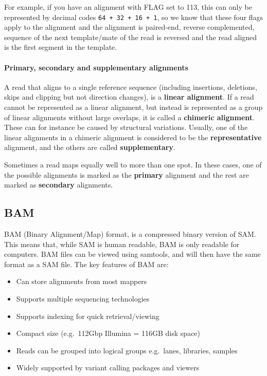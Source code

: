 \documentclass[11pt]{article}
\providecommand{\tightlist}{%
      \setlength{\itemsep}{0pt}\setlength{\parskip}{0pt}}
\begin{document}
For example, if you have an alignment with FLAG set to 113, this can
only be represented by decimal codes \texttt{64\ +\ 32\ +\ 16\ +\ 1}, so
we know that these four flags apply to the alignment and the alignment
is paired-end, reverse complemented, sequence of the next template/mate
of the read is reversed and the read aligned is the first segment in the
template.

\hypertarget{primary-secondary-and-supplementary-alignments}{%
\paragraph{Primary, secondary and supplementary
alignments}\label{primary-secondary-and-supplementary-alignments}}

A read that aligns to a single reference sequence (including insertions,
deletions, skips and clipping but not direction changes), is a
\textbf{linear alignment}. If a read cannot be represented as a linear
alignment, but instead is represented as a group of linear alignments
without large overlaps, it is called a \textbf{chimeric alignment}.
These can for instance be caused by structural variations. Usually, one
of the linear alignments in a chimeric alignment is considered to be the
\textbf{representative} alignment, and the others are called
\textbf{supplementary}.

Sometimes a read maps equally well to more than one spot. In these
cases, one of the possible alignments is marked as the \textbf{primary}
alignment and the rest are marked as \textbf{secondary} alignments.

\hypertarget{bam}{%
\subsection{BAM}\label{bam}}

BAM (Binary Alignment/Map) format, is a compressed binary version of
SAM. This means that, while SAM is human readable, BAM is only readable
for computers. BAM files can be viewed using samtools, and will then
have the same format as a SAM file. The key features of BAM are:

\begin{itemize}
\tightlist
\item
  Can store alignments from most mappers
\item
  Supports multiple sequencing technologies
\item
  Supports indexing for quick retrieval/viewing
\item
  Compact size (e.g.~112Gbp Illumina = 116GB disk space)
\item
  Reads can be grouped into logical groups e.g.~lanes, libraries,
  samples
\item
  Widely supported by variant calling packages and viewers
\end{itemize}
\end{document}
